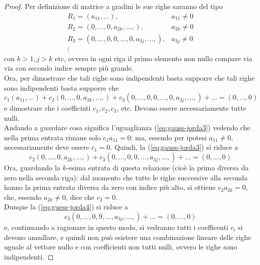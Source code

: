 \documentclass{book}
\theoremstyle{definition}
\theoremstyle{plain}
\begin{document}
\begin{proof}
  Per definizione di matrice a gradini le sue righe saranno del tipo
  \begin{eqnarray*}
    R_1=(a_{11},\dots), & a_{11}\neq0\\
    R_2=(0,\dots, 0, a_{2k},\dots,), & a_{2k}\neq 0\\
    R_3=(0,\dots,0,0,\dots,0,a_{3j},\dots,), & a_{3j}\neq 0\\
    \vdots
  \end{eqnarray*}
  con $k>1,j>k$ etc, ovvero in ogni riga il primo elemento non nullo
  compare via via con secondo indice sempre più grande.\\
  Ora, per dimostrare che tali righe sono indipendenti basta supporre che
  tali righe sono indipendenti basta supporre che
  \begin{equation}
    \label{eq:gauss-jorda3}
    c_1(a_{11},\dots)+c_2(0,\dots,0,a_{2k},\dots,)+c_3(0,\dots,0,0,\dots,
    0,a_{3j},\dots,)+\dots=(0,\dots,0)
  \end{equation}
  e dimostrare che i coefficinti $c_1,c_2,c_3$, etc. Devono essere
  necessariamente tutte nulli.\\
  Andando a guardare cosa significa l'uguaglianza (\ref{eq:gauss-jorda3})
  vedendo che nella prima entrata rimane solo $c_1a_{11}=0$: ma, essendo
  per ipotesi $a_{11}\neq 0$, necessariamente deve essere $c_1=0$. Quindi,
  la (\ref{eq:gauss-jorda3}) si riduce a
  \begin{equation}
    \label{eq:guess-jorda4}
    c_2(0,\dots,0,a_{2k},\dots,)+c_3(0,\dots,0,0,\dots,a_{3j},\dots,)+
    \dots= (0,\dots,0)
  \end{equation}
  Ora, guardando la $k$-esima entrata di questa relazione (cioè la prima
  diversa da zero nella seconda riga): dal momento che tutte le righe
  successive alla seconda hanno la prima entrata diversa da zero con
  indice più alto, si ottiene $c_2a_{2k}=0$, che, essendo $a_{2k}\neq 0$,
  dice che $c_2=0$.\\
  Dunque la (\ref{eq:guess-jorda4}) si riduce a
  \begin{equation*}
    c_3(0,\dots,0,9,\dots,a_{3j},\dots,)+\dots=(0,\dots,0)
  \end{equation*}
  e, continuando a ragionare in questo modo, si vedranno tutti i
  coefficenti $c_i$ si devono annullare, e quindi non può esistere una
  combinazione lineare delle righe uguale al vettore nullo e con
  coefficienti non tutti nulli, ovvero le righe sono indipendenti.
\end{proof}
\end{document}
